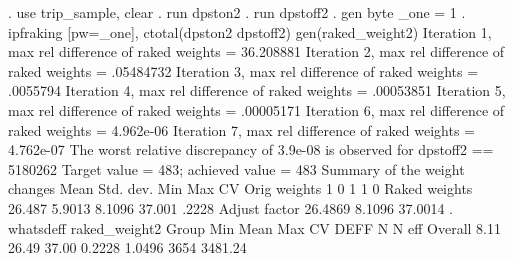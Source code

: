 . use trip_sample, clear
{\smallskip}
. run dpston2
{\smallskip}
. run dpstoff2
{\smallskip}
. gen byte _one = 1       
{\smallskip}
. ipfraking [pw=_one], ctotal(dpston2 dpstoff2) gen(raked_weight2)
{\smallskip}
 Iteration 1, max rel difference of raked weights = 36.208881
 Iteration 2, max rel difference of raked weights = .05484732
 Iteration 3, max rel difference of raked weights = .0055794
 Iteration 4, max rel difference of raked weights = .00053851
 Iteration 5, max rel difference of raked weights = .00005171
 Iteration 6, max rel difference of raked weights = 4.962e-06
 Iteration 7, max rel difference of raked weights = 4.762e-07
The worst relative discrepancy of  3.9e-08 is observed for dpstoff2 == 5180262     
Target value =        483; achieved value =        483
{\smallskip}
   Summary of the weight changes
{\smallskip}
              {\VBAR}    Mean    Std. dev.    Min        Max       CV
Orig weights  {\VBAR}        1          0         1           1       0
Raked weights {\VBAR}   26.487     5.9013    8.1096      37.001   .2228
Adjust factor {\VBAR}  26.4869               8.1096     37.0014
{\smallskip}
. whatsdeff raked_weight2
{\smallskip}
    Group     {\VBAR}   Min     {\VBAR}   Mean    {\VBAR}   Max     {\VBAR}    CV   {\VBAR}   DEFF  {\VBAR}   N   {\VBAR}  N eff
      Overall {\VBAR}      8.11 {\VBAR}     26.49 {\VBAR}     37.00 {\VBAR}  0.2228 {\VBAR}  1.0496 {\VBAR}  3654 {\VBAR} 3481.24
{\smallskip}

